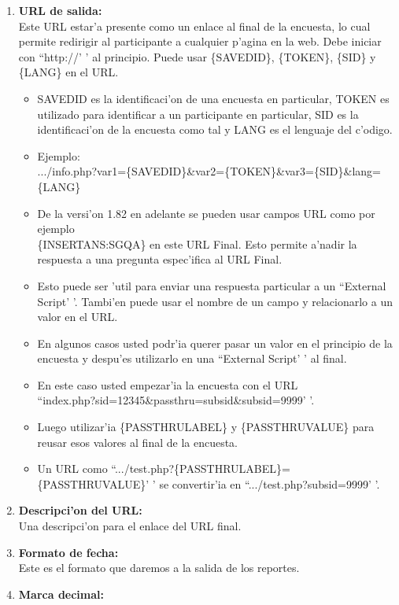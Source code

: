 \documentclass[12pt,spanish]{report}
\begin{document}
\begin{enumerate}
	\item {\bf URL de salida:} \\ 
	Este URL estar'a presente como un enlace al final de la encuesta, lo cual permite redirigir al participante a cualquier p'agina en la web. Debe iniciar con ``http://' ' al principio. Puede usar \{SAVEDID\}, \{TOKEN\}, \{SID\} y \{LANG\} en el URL.\\
	\begin{itemize}
		\item SAVEDID es la identificaci'on de una encuesta en particular, TOKEN es utilizado para identificar a un participante en particular, SID es la identificaci'on de la encuesta como tal y LANG es el lenguaje del c'odigo.
		\item Ejemplo: \\
		.../info.php?var1=\{SAVEDID\}\&var2=\{TOKEN\}\&var3=\{SID\}\&lang=\{LANG\}
		\item De la versi'on 1.82 en adelante se pueden usar campos URL como por ejemplo\\ \{INSERTANS:SGQA\} en este URL Final. Esto permite a'nadir la respuesta a una pregunta espec'ifica al URL Final.
		\item Esto puede ser 'util para enviar una respuesta particular a un ``External Script' '. Tambi'en puede usar el nombre de un campo y relacionarlo a un valor en el URL. 
		\item En algunos casos usted podr'ia querer pasar un valor en el principio de la encuesta y despu'es utilizarlo en una ``External Script' ' al final. 
		\item En este caso usted empezar'ia la encuesta con el URL\\ ``index.php?sid=12345\&passthru=subsid\&subsid=9999' '.
		\item Luego utilizar'ia \{PASSTHRULABEL\} y \{PASSTHRUVALUE\} para reusar esos valores al final de la encuesta. 
		\item Un URL como 	``.../test.php?\{PASSTHRULABEL\}=\{PASSTHRUVALUE\}' ' se convertir'ia en ``.../test.php?subsid=9999' '.
	\end{itemize}
	\item {\bf Descripci'on del URL: } \\
	 Una descripci'on para el enlace del URL final.
	\item {\bf Formato de fecha: }\\
		Este es el formato que daremos a la salida de los reportes.
	\item {\bf Marca decimal: }\\

\end{enumerate}
\end{document}
